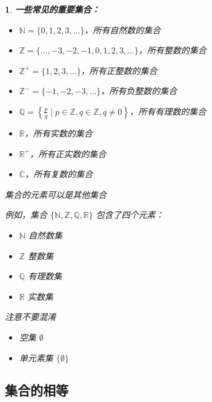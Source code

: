 \documentclass[UTF8]{report}
\theoremstyle{MyLineTheoremStyle} %
\theoremstyle{MyBlockTheoremStyle} %
\theoremstyle{MySubsubsectionStyle} %
\newtheorem{definition}{}
\begin{document}
\begin{definition}
    \textbf{一些常见的重要集合：}\par
    \begin{itemize}
        \item $\mathbb{N} = \{0, 1, 2, 3, \ldots\}$，所有自然数的集合
        \item $\mathbb{Z} = \{\ldots, -3, -2, -1, 0, 1, 2, 3, \ldots\}$，所有整数的集合
        \item $\mathbb{Z}^+ = \{1, 2, 3, \ldots\}$，所有正整数的集合
        \item $\mathbb{Z}^- = \{-1, -2, -3, \ldots\}$，所有负整数的集合
        \item $\mathbb{Q} = \left\{ \frac{p}{q} \mid p \in \mathbb{Z}, q \in \mathbb{Z}, q \neq 0 \right\}$，所有有理数的集合
        \item $\mathbb{R}$，所有实数的集合
        \item $\mathbb{R}^+$，所有正实数的集合
        \item $\mathbb{C}$，所有复数的集合
    \end{itemize}

    集合的元素可以是其他集合\par
    例如，集合 $\{\mathbb{N}, \mathbb{Z}, \mathbb{Q}, \mathbb{R}\}$ 包含了四个元素：\par
    \begin{itemize}
        \item $\mathbb{N}$ 自然数集
        \item $\mathbb{Z}$ 整数集
        \item $\mathbb{Q}$ 有理数集
        \item $\mathbb{R}$ 实数集
    \end{itemize}

    注意不要混淆\par
    \begin{itemize}
        \item 空集 $\emptyset$
        \item 单元素集 $\{\emptyset\}$
    \end{itemize}
\end{definition}

\subsection{集合的相等}
\end{document}
